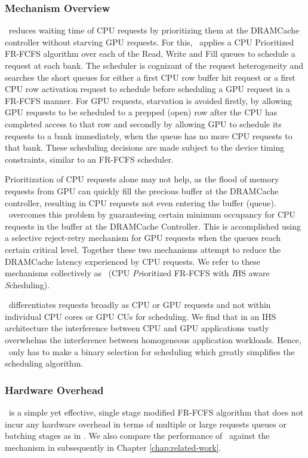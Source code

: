 \subsubsection{Mechanism Overview}
\par \cachename\ reduces waiting time of CPU requests by prioritizing them at the DRAMCache controller without starving GPU requests. 
For this, \cachename\ applies a CPU Prioritized FR-FCFS algorithm over each of the Read, Write and Fill queues to schedule a request at each bank. 
The scheduler is cognizant of the request heterogeneity and searches the short queues for either a first CPU row buffer hit request or a first CPU row activation request to schedule before scheduling a GPU request in a FR-FCFS manner. For GPU requests, starvation is avoided firstly, by allowing GPU requests to be scheduled to a prepped (open) row after the CPU has completed access to that row and secondly by allowing GPU to schedule its requests to a bank immediately, when the queue has no more CPU requests to that bank. These scheduling decisions are made subject to the device timing constraints, similar to an FR-FCFS scheduler.
\par Prioritization of CPU requests alone may not help, as the flood of memory requests from  GPU can quickly fill the precious buffer at the DRAMCache controller, resulting in CPU requests not even entering the buffer (queue). \cachename\ overcomes this problem by guaranteeing certain minimum occupancy for CPU requests in the buffer at the DRAMCache Controller. This is accomplished using a selective reject-retry mechanism for GPU requests when the queues reach certain critical level.  Together these two mechanisms attempt to reduce the DRAMCache latency experienced by CPU requests.  We refer to these  mechanisms collectively as \prioname\ (CPU \emph{Pr}ioritized FR-FCFS with \emph{I}HS aware \emph{S}cheduling). 
\par \prioname\ differentiates requests broadly as CPU or GPU requests and not within individual CPU cores or GPU CUs for scheduling. We find that in an IHS architecture the interference between CPU and GPU applications vastly overwhelms the interference between homogeneous application workloads. Hence, \prioname\ only has to make a binary selection for scheduling which greatly simplifies the scheduling algorithm. 

\subsubsection{Hardware Overhead}
\prioname\ is a simple yet effective, single stage modified FR-FCFS algorithm that does not incur any hardware overhead in terms of multiple or large requests queues or batching stages as in \cite{sms}. We also compare the performance of \prioname\ against the mechanism in \cite{sms} subsequently in Chapter \ref{chap:related-work}.


